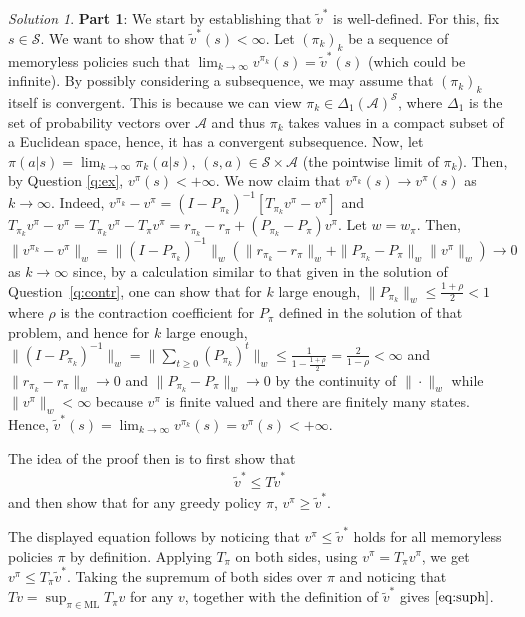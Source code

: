 \documentclass{article}
\newcommand{\norm}[1]{\| #1 \|}
\DeclareMathOperator*{\1}{\mathbbm{1}}
\theoremstyle{definition}
\theoremstyle{remark}
\newtheorem*{solution*}{Solution}
\newcommand{\cS}{\mathcal{S}}
\newcommand{\cA}{\mathcal{A}}
\begin{document}
\begin{solution*}
\noindent \textbf{Part 1}:
{\color{red} We start by establishing that $\tilde{v}^*$ is well-defined.
For this, fix $s\in \cS$. We want to show that $\tilde{v}^*(s)<\infty$.
Let $(\pi_k)_k$ be a sequence of memoryless policies such that $\lim_{k\to\infty} v^{\pi_k}(s) = \tilde{v}^*(s)$ (which could be infinite).
By possibly considering a subsequence, we may assume that $(\pi_k)_k$ itself is convergent. This is because we can view $\pi_k\in \Delta_1(\cA)^{\cS}$, where $\Delta_1$ is the set of probability vectors over $\cA$ and thus $\pi_k$ takes values in a compact subset of a Euclidean space, hence, it has a convergent subsequence.
Now, let $\pi(a|s) = \lim_{k\to\infty} \pi_k(a|s)$, $(s,a)\in \cS \times \cA$ (the pointwise limit of $\pi_k$).
Then, by Question \ref{q:ex}, $v^\pi(s)<+\infty$. 
We now claim that $v^{\pi_k}(s) \to v^{\pi}(s)$ as $k\to\infty$.
Indeed, $v^{\pi_k} - v^{\pi} = (I-P_{\pi_k})^{-1}[T_{\pi_k} v^{\pi} - v^{\pi} ]$
and $T_{\pi_k} v^{\pi} - v^{\pi} = T_{\pi_k} v^{\pi} - T_\pi v^{\pi} = r_{\pi_k}-r_\pi + (P_{\pi_k}-P_{\pi}) v^\pi$. Let $w = w_{\pi}$.
Then, $\norm{v^{\pi_k} - v^{\pi}}_w = 
\norm{ (I-P_{\pi_k})^{-1} }_w \left( \norm{ r_{\pi_k} -r_{\pi}}_w + \norm{ P_{\pi_k}-P_{\pi}}_w \norm{v^\pi}_w \right)\to 0$ as $k\to\infty$ since, by a calculation
similar to that given in the solution of Question~\ref{q:contr},
one can show that for $k$ large enough, $\norm{P_{\pi_k}}_w \le \frac{1+\rho}{2}<1$ where $\rho$ is the 
contraction coefficient for $P_{\pi}$ defined in the solution of that problem, and hence
for $k$ large enough,
$\norm{ (I-P_{\pi_k})^{-1} }_w = \norm{\sum_{t\ge 0} (P_{\pi_k})^t }_w \le \frac{1}{1-\frac{1+\rho}{2}}=\frac{2}{1-\rho}<\infty$ and
$\norm{ r_{\pi_k} -r_{\pi}}_w\to 0$
and $\norm{ P_{\pi_k}-P_{\pi}}_w\to 0$ by the continuity of $\norm{\cdot}_w$ while
$\norm{v^\pi}_w<\infty$ because $v^\pi$ is finite valued and there are finitely many states.
Hence, $\tilde{v}^*(s) = \lim_{k\to\infty} v^{\pi_k}(s) = v^{\pi}(s)<+\infty$.
}

The idea of the proof {\color{red} then} is  to first show that
\begin{align}
\tilde{v}^*\le T \tilde{v}^*
\label{eq:suph}
\end{align}
and then show that for any greedy policy $\pi$, $v^\pi \ge \tilde{v}^*$.

The displayed equation follows by noticing that
$v^\pi \le \tilde{v}^*$ holds for all memoryless policies $\pi$ by definition. Applying $T_\pi$ on both sides, using $v^\pi = T_\pi v^\pi$, we get $v^\pi \le T_\pi \tilde{v}^*$. Taking the supremum of both sides over $\pi$ and noticing that $T v = \sup_{\pi \in \text{ML}} T_\pi v$ for any $v$, together with the definition of $\tilde{v}^*$ gives $\eqref{eq:suph}$.


\end{solution*}
\end{document}
